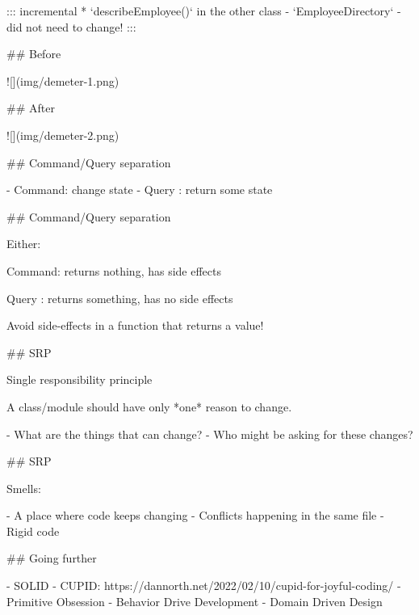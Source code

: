 ::: incremental
* `describeEmployee()` in the other class - `EmployeeDirectory` - did not need to change!
:::


## Before

![](img/demeter-1.png)

## After

![](img/demeter-2.png)



## Command/Query separation

- Command: change state
- Query : return some state

## Command/Query separation

Either:

Command: returns nothing, has side effects

Query : returns something, has no side effects

Avoid side-effects in a function that returns a value!

## SRP

Single responsibility principle

A class/module should have only *one* reason to change.

- What are the things that can change?
- Who might be asking for these changes?


## SRP

Smells:

- A place where code keeps changing
- Conflicts happening in the same file
- Rigid code

##  Going further

- SOLID
- CUPID: https://dannorth.net/2022/02/10/cupid-for-joyful-coding/
- Primitive Obsession
- Behavior Drive Development
- Domain Driven Design

